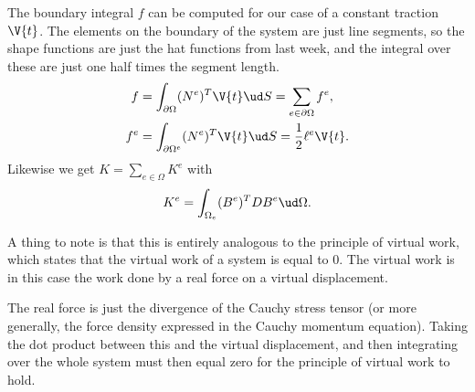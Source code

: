 \documentclass[sigconf]{acmart}
\begin{document}
The boundary integral $ f $ can be computed for our case of a constant traction $ \V{t} $. The elements on the boundary of the system are just line segments, so the shape functions are just the hat functions from last week, and the integral over these are just one half times the segment length.
\begin{align}
	f &= \int_{\partial\Omega} (N^e)^T \V{t} \ud S = \sum_{e \in \partial \Omega} f^e, \nonumber \\
	f^e &= \int_{\partial \Omega^e} (N^e)^T \V{t} \ud S = \frac{1}{2} \ell^e \V{t}. \label{eq:boundary_elem} 
\end{align}
Likewise we get $ K = \sum_{e\in \Omega}K^e $ with 
\begin{equation*}
	K^e = \int_{\Omega_e}(B^e)^T D B^e \ud \Omega.
\end{equation*}

A thing to note is that this is entirely analogous to the principle of virtual work, which states that the virtual work of a system is equal to 0. The virtual work is in this case the work done by a real force on a virtual displacement.

The real force is just the divergence of the Cauchy stress tensor (or more generally, the force density expressed in the Cauchy momentum equation). Taking the dot product between this and the virtual displacement, and then integrating over the whole system must then equal zero for the principle of virtual work to hold.
\end{document}
